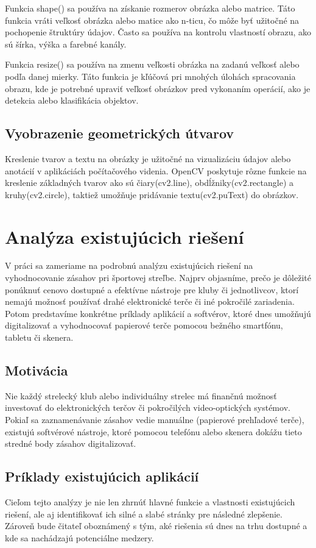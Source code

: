 Funkcia shape() sa používa na získanie rozmerov obrázka alebo matrice. Táto funkcia vráti veľkosť obrázka alebo 
matice ako n-ticu, čo môže byť užitočné na pochopenie štruktúry údajov. Často sa používa na kontrolu vlastností 
obrazu, ako sú šírka, výška a farebné kanály.

Funkcia resize() sa používa na zmenu veľkosti obrázka na zadanú veľkosť alebo podľa danej mierky. Táto funkcia 
je kľúčová pri mnohých úlohách spracovania obrazu, kde je potrebné upraviť veľkosť obrázkov pred vykonaním operácií, 
ako je detekcia alebo klasifikácia objektov.

\subsection{Vyobrazenie geometrických útvarov}
Kreslenie tvarov a textu na obrázky je užitočné na vizualizáciu údajov alebo anotácií v aplikáciách počítačového 
videnia. OpenCV poskytuje rôzne funkcie na kreslenie základných tvarov ako sú čiary(cv2.line), obdĺžniky(cv2.rectangle) 
a kruhy(cv2.circle), taktiež umožňuje pridávanie textu(cv2.puText) do obrázkov.


\section{Analýza existujúcich riešení}
V práci sa zameriame na podrobnú analýzu existujúcich riešení na vyhodnocovanie zásahov pri športovej streľbe. 
Najprv objasníme, prečo je dôležité ponúknuť cenovo dostupné a efektívne nástroje pre kluby či jednotlivcov, ktorí 
nemajú možnosť používať drahé elektronické terče či iné pokročilé zariadenia. Potom predstavíme konkrétne 
príklady aplikácií a softvérov, ktoré dnes umožňujú digitalizovať a vyhodnocovať papierové terče pomocou bežného 
smartfónu, tabletu či skenera.

\subsection{Motivácia}
Nie každý strelecký klub alebo individuálny strelec má finančnú možnosť investovať do elektronických terčov či 
pokročilých video-optických systémov. Pokiaľ sa zaznamenávanie zásahov vedie manuálne (papierové prehľadové terče), 
existujú softvérové nástroje, ktoré pomocou telefónu alebo skenera dokážu tieto 
stredné body zásahov digitalizovať.

\subsection{Príklady existujúcich aplikácií}
Cieľom tejto analýzy je nie len zhrnúť hlavné funkcie a vlastnosti existujúcich riešení, 
ale aj identifikovať ich silné a slabé stránky pre následné zlepšenie. Zároveň bude čitateľ oboznámený s tým, aké 
riešenia sú dnes na trhu dostupné a kde sa nachádzajú potenciálne medzery.

